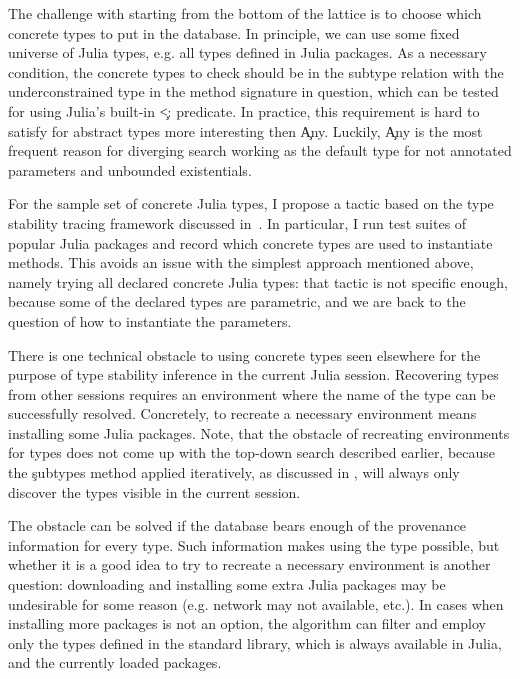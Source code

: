 The challenge with starting from the bottom of the lattice is to choose which concrete
types to put in the database.
In principle, we can use some fixed universe of Julia types, e.g. all types defined
in Julia packages. As a necessary condition, the concrete types to check should
be in the subtype relation with the underconstrained type in the method
signature in question, which can be tested for using Julia's built-in \c{<:}
predicate. In practice, this requirement is hard to satisfy for abstract types
more interesting then \c{Any}. Luckily, \c{Any} is the most frequent reason for
diverging search working as the default type for not annotated parameters and
unbounded existentials.

For the sample set of concrete Julia types, I propose a tactic based on the type
stability tracing framework discussed in~. In
particular, I run test suites of popular Julia packages and record which
concrete types are used to instantiate methods.
This avoids an issue with the simplest approach mentioned above, namely trying
all declared concrete Julia types: that tactic is not specific enough,
because some of the declared types are parametric, and we are back to the
question of how to instantiate the parameters.

There is one technical obstacle to using concrete types seen elsewhere for the purpose
of type stability inference in the current Julia session. Recovering types from
other sessions requires an environment where the name of the type can be
successfully resolved. Concretely, to recreate a necessary environment means
installing some Julia packages.
Note, that the obstacle of recreating environments for types does not come up
with the top-down search described earlier, because the \c{subtypes} method
applied iteratively, as discussed in , will always only
discover the types visible in the current session.

The obstacle can be solved if the database bears enough
of the provenance information for every type. Such information makes using the
type possible, but whether it is a good idea to try to recreate a necessary
environment is another question: downloading and
installing some extra Julia packages may be undesirable for some reason (e.g.
network may not available, etc.). In cases when installing more packages is not
an option, the algorithm can filter and
employ only the types defined in the standard library, which is always available
in Julia, and the currently loaded packages.


